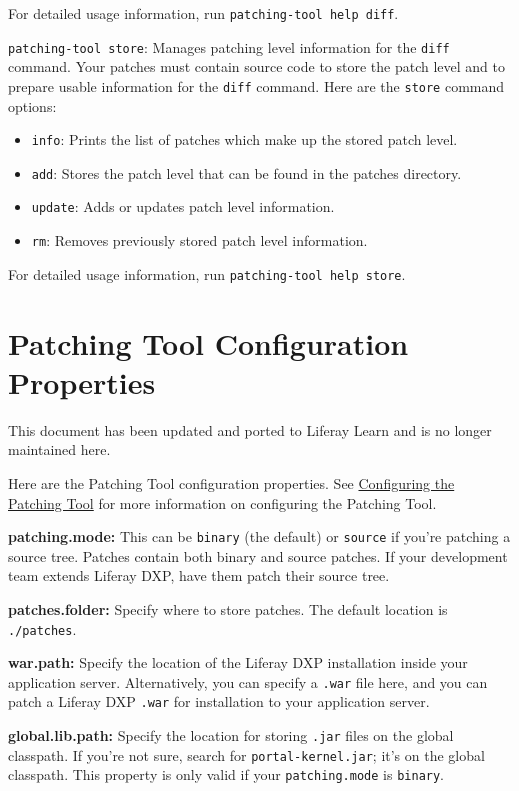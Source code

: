 For detailed usage information, run \texttt{patching-tool\ help\ diff}.

\texttt{patching-tool\ store}: Manages patching level information for
the \texttt{diff} command. Your patches must contain source code to
store the patch level and to prepare usable information for the
\texttt{diff} command. Here are the \texttt{store} command options:

\begin{itemize}
\tightlist
\item
  \texttt{info}: Prints the list of patches which make up the stored
  patch level.
\item
  \texttt{add}: Stores the patch level that can be found in the patches
  directory.
\item
  \texttt{update}: Adds or updates patch level information.
\item
  \texttt{rm}: Removes previously stored patch level information.
\end{itemize}

For detailed usage information, run \texttt{patching-tool\ help\ store}.

\chapter{Patching Tool Configuration
Properties}\label{patching-tool-configuration-properties}

{This document has been updated and ported to Liferay Learn and is no
longer maintained here.}

Here are the Patching Tool configuration properties. See
\href{/docs/7-2/deploy/-/knowledge_base/d/configuring-the-patching-tool}{Configuring
the Patching Tool} for more information on configuring the Patching
Tool.

\textbf{patching.mode:} This can be \texttt{binary} (the default) or
\texttt{source} if you're patching a source tree. Patches contain both
binary and source patches. If your development team extends Liferay DXP,
have them patch their source tree.

\textbf{patches.folder:} Specify where to store patches. The default
location is \texttt{./patches}.

\textbf{war.path:} Specify the location of the Liferay DXP installation
inside your application server. Alternatively, you can specify a
\texttt{.war} file here, and you can patch a Liferay DXP \texttt{.war}
for installation to your application server.

\textbf{global.lib.path:} Specify the location for storing \texttt{.jar}
files on the global classpath. If you're not sure, search for
\texttt{portal-kernel.jar}; it's on the global classpath. This property
is only valid if your \texttt{patching.mode} is \texttt{binary}.

